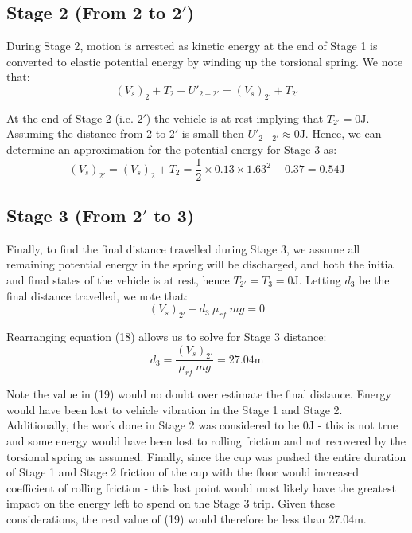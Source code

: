 \documentclass[a4paper]{article}
\begin{document}
\subsection{Stage 2 (From 2 to 2$'$)}
During Stage 2, motion is arrested as kinetic energy at the end of Stage 1 is converted to elastic potential energy by winding up the torsional spring. We note that:
\begin{equation}
	(V_s)_2 + T_2 + U'_{2-2'} = (V_s)_{2'} + T_{2'}
\end{equation}

At the end of Stage 2 (i.e. $2'$) the vehicle is at rest implying that $T_{2'} = 0\si{\joule}$. Assuming the distance from 2 to $2'$ is small then $U'_{2-2'} \approx 0\si{\joule}$. Hence, we can determine an approximation for the potential energy for Stage 3 as:
\begin{equation}
	(V_s)_{2'} = (V_s)_2 + T_2 = \frac{1}{2} \times 0.13 \times 1.63^2 + 0.37 = 0.54\si{\joule}
\end{equation}

\subsection{Stage 3 (From 2$'$ to 3)}
Finally, to find the final distance travelled during Stage 3, we assume all remaining potential energy in the spring will be discharged, and both the initial and final states of the vehicle is at rest, hence $T_{2'} = T_3 = 0 \si{\joule}$. Letting $d_3$ be the final distance travelled, we note that:
\begin{equation}
	(V_s)_{2'} - d_3 \ \mu_{rf} \ mg = 0
\end{equation}

Rearranging equation (18) allows us to solve for Stage 3 distance:
\begin{equation}
	d_3 = \frac{(V_s)_{2'}}{\mu_{rf} \ mg} = 27.04\si{\meter}
\end{equation}

Note the value in (19) would no doubt over estimate the final distance. Energy would have been lost to vehicle vibration in the Stage 1 and Stage 2. Additionally, the work done in Stage 2 was considered to be 0$\si{\joule}$ - this is not true and some energy would have been lost to rolling friction and not recovered by the torsional spring as assumed. Finally, since the cup was pushed the entire duration of Stage 1 and Stage 2 friction of the cup with the floor would increased coefficient of rolling friction - this last point would most likely have the greatest impact on the energy left to spend on the Stage 3 trip. Given these considerations, the real value of (19) would therefore be less than 27.04$\si{\meter}$.
\end{document}
